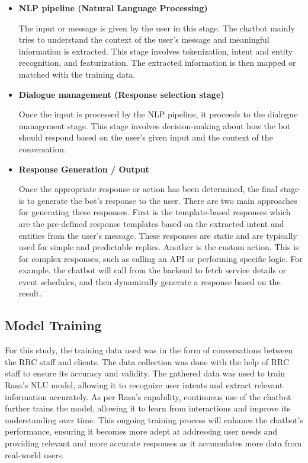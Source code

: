 \begin{itemize}
	\item \textbf{NLP pipeline (Natural Language Processing)}
	
	The input or message is given by the user in this stage. The chatbot mainly tries to understand the context of the user’s message and meaningful information is extracted. This stage involves tokenization, intent and entity recognition, and featurization. The extracted information is then mapped or matched with the training data.
	
	\item \textbf{Dialogue management (Response selection stage)}
	
	Once the input is processed by the NLP pipeline, it proceeds to the dialogue management stage. This stage involves decision-making about how the bot should respond based on the user’s given input and the context of the conversation. 
	
	\item \textbf{Response Generation / Output}
	
	Once the appropriate response or action has been determined, the final stage is to generate the bot’s response to the user.  There are two main approaches for generating these responses. First is the template-based responses which are the pre-defined response templates based on the extracted intent and entities from the user’s message. These responses are static and are typically used for simple and predictable replies. Another is the custom action. This is for complex responses, such as calling an API or performing specific logic. For example, the chatbot will call from the backend to fetch service details or event schedules, and then dynamically generate a response based on the result.
	
\end{itemize}

\subsection{Model Training}

For this study, the training data used was in the form of conversations between the RRC staff and clients. The data collection was done with the help of RRC staff to ensure its accuracy and validity. The gathered data was used to train Rasa’s NLU model, allowing it to recognize user intents and extract relevant information accurately. As per Rasa’s capability, continuous use of the chatbot further trains the model, allowing it to learn from interactions and improve its understanding over time. This ongoing training process will enhance the chatbot’s performance, ensuring it becomes more adept at addressing user needs and providing relevant and more accurate responses as it accumulates more data from real-world users.

